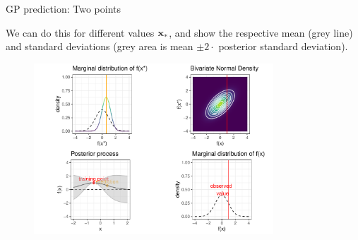 \begin{frame}{GP prediction: Two points}

\begin{footnotesize}
  We can do this for different values $\mathbf{x}_*$, and show the respective mean (grey line) and standard deviations (grey area is mean $\pm 2 \cdot $ posterior standard deviation). 
\end{footnotesize}\vspace*{0.2cm}


\begin{figure}
  \includegraphics[width=0.8\textwidth]{figure/gp_pred/6.pdf}
\end{figure}

\end{frame}

